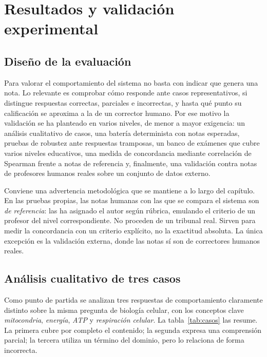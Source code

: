 \chapter{Resultados y validación experimental}
\label{cap:resultados}

\section{Diseño de la evaluación}

Para valorar el comportamiento del sistema no basta con indicar que genera una nota. Lo relevante es comprobar cómo responde ante casos representativos, si distingue respuestas correctas, parciales e incorrectas, y hasta qué punto su calificación se aproxima a la de un corrector humano. Por ese motivo la validación se ha planteado en varios niveles, de menor a mayor exigencia: un análisis cualitativo de casos, una batería determinista con notas esperadas, pruebas de robustez ante respuestas tramposas, un banco de exámenes que cubre varios niveles educativos, una medida de concordancia mediante correlación de Spearman frente a notas de referencia y, finalmente, una validación contra notas de profesores humanos reales sobre un conjunto de datos externo.

Conviene una advertencia metodológica que se mantiene a lo largo del capítulo. En las pruebas propias, las notas humanas con las que se compara el sistema son \emph{de referencia}: las ha asignado el autor según rúbrica, emulando el criterio de un profesor del nivel correspondiente. No proceden de un tribunal real. Sirven para medir la concordancia con un criterio explícito, no la exactitud absoluta. La única excepción es la validación externa, donde las notas sí son de correctores humanos reales.

\section{Análisis cualitativo de tres casos}

Como punto de partida se analizan tres respuestas de comportamiento claramente distinto sobre la misma pregunta de biología celular, con los conceptos clave \emph{mitocondria}, \emph{energía}, \emph{ATP} y \emph{respiración celular}. La tabla~\ref{tab:casos} las resume. La primera cubre por completo el contenido; la segunda expresa una comprensión parcial; la tercera utiliza un término del dominio, pero lo relaciona de forma incorrecta.


